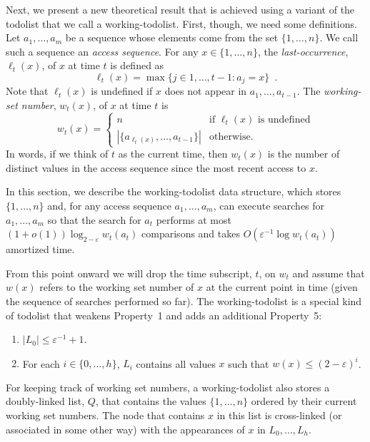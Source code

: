 \documentclass[lotsofwhite]{patmorin}
\newcommand{\eps}{\varepsilon}
\begin{document}
Next, we present a new theoretical result that is achieved using a
variant of the todolist that we call a working-todolist.  First, though, we need
some definitions.  Let $a_1,\ldots,a_m$ be a sequence whose elements come
from the set $\{1,\ldots,n\}$.  We call such a sequence an \emph{access
sequence}. For any $x\in\{1,\ldots,n\}$, the \emph{last-occurrence},
$\ell_t(x)$, of $x$ at time $t$ is defined as
\[
   \ell_t(x)=\max\{j\in{1,\ldots,t-1}: a_{j} = x\} \enspace .
\]
Note that $\ell_t(x)$ is undefined if $x$ does not appear in
$a_1,\ldots,a_{t-1}$.  The \emph{working-set number}, $w_t(x)$, of $x$
at time $t$ is
\[
    w_t(x) = \begin{cases}
               n & \text{if $\ell_t(x)$ is undefined} \\
               |\{a_{\ell_t(x)},\ldots,a_{t-1}\}| & \text{otherwise.}
             \end{cases}
\]
In words, if we think of $t$ as the current time, then $w_t(x)$ is the
number of distinct values in the access sequence since the most recent
access to $x$.

In this section, we describe the working-todolist data structure, which
stores $\{1,\ldots,n\}$ and, for any access sequence $a_1,\ldots,a_m$,
can execute searches for $a_1,\ldots,a_m$ so that the search for $a_t$
performs at most $(1+o(1))\log_{2-\eps} w_t(a_t)$ comparisons and takes
$O(\eps^{-1}\log w_t(a_t))$ amortized time.

From this point onward we will drop the time subscript, $t$, on $w_t$
and assume that $w(x)$ refers to the working set number of $x$ at the
current point in time (given the sequence of searches performed so far).
The working-todolist is a special kind of todolist that weakens Property~1
and adds an additional Property~5:

\begin{enumerate}
\item $|L_0|\le \eps^{-1}+1$.
\setcounter{enumi}{4}
\item For each $i\in\{0,\ldots,h\}$, $L_i$ contains all values $x$ such that $w(x)\le (2-\eps)^i$.
\end{enumerate}

For keeping track of working set numbers, a working-todolist also stores a
doubly-linked list, $Q$, that contains the values $\{1,\ldots,n\}$
ordered by their current working set numbers.  The node that contains $x$
in this list is cross-linked (or associated in some other way) with the
appearances of $x$ in $L_0,\ldots,L_h$.
\end{document}
